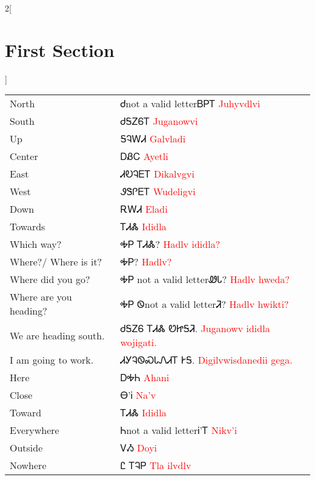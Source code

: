 \begin{multicols}{2}[\section{First Section}]\begin{minipage}{\linewidth}
\begin{tabular}{p{3cm} p{11cm}}
North & Ꮷnot a valid letterᏴᏢᎢ 
 \newline \textcolor{red}{Juhyvdlvi}\\
South & ᏧᎦᏃᏮᎢ 
 \newline \textcolor{red}{Juganowvi}\\
Up & ᎦᎸᎳᏗ 
 \newline \textcolor{red}{Galvladi}\\
Center & ᎠᏰᏟ 
 \newline \textcolor{red}{Ayetli}\\
East & ᏗᎧᎸᎬᎢ 
 \newline \textcolor{red}{Dikalvgvi}\\
West & ᏭᏕᎵᎬᎢ 
 \newline \textcolor{red}{Wudeligvi}\\
Down & ᎡᎳᏗ 
 \newline \textcolor{red}{Eladi}\\
Towards & ᎢᏗᏜ 
 \newline \textcolor{red}{Ididla}\\
Which way? & ᎭᏢ ᎢᏗᏜ? 
 \newline \textcolor{red}{Hadlv ididla?}\\
Where?/ Where is it? & ᎭᏢ? 
 \newline \textcolor{red}{Hadlv?}\\
Where did you go? & ᎭᏢ not a valid letterᏪᏓ? 
 \newline \textcolor{red}{Hadlv hweda?}\\
Where are you heading? & ᎭᏢ Ꮻnot a valid letterᏘ? 
 \newline \textcolor{red}{Hadlv hwikti?}\\
We are heading south. & ᏧᎦᏃᏮ ᎢᏗᏜ ᏬᏥᎦᏘ. 
 \newline \textcolor{red}{Juganowv ididla wojigati.}\\
I am going to work. & ᏗᎩᎸᏫᏍᏓᏁᏗᎢ ᎨᎦ. 
 \newline \textcolor{red}{Digilvwisdanedii gega.}\\
Here & ᎠᎭᏂ 
 \newline \textcolor{red}{Ahani}\\
Close & Ꮎ’Ꭵ 
 \newline \textcolor{red}{Na’v}\\
Toward & ᎢᏗᏜ 
 \newline \textcolor{red}{Ididla}\\
Everywhere & Ꮒnot a valid letterᎥ’Ꭲ 
 \newline \textcolor{red}{Nikv’i}\\
Outside & ᏙᏱ 
 \newline \textcolor{red}{Doyi}\\
Nowhere & Ꮭ ᎢᎸᏢ 
 \newline \textcolor{red}{Tla ilvdlv}\\


\end{tabular}
\end{minipage}
\end{multicols}
